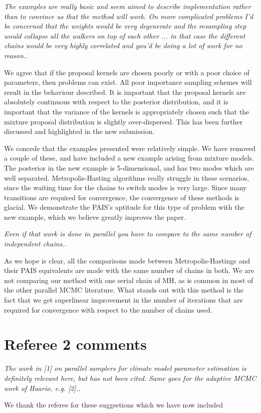 \documentclass{article}
\newcommand{\comment}[2]{\vspace{0.6cm}{\bf Comment:} {\it #1.}

\vspace{0.3cm}{\bf Answer:} #2}
\begin{document}
\comment{The examples are really basic and seem aimed to describe implementation rather than to convince us that the method will work. On more complicated problems I'd be concerned that the weights would be very degenerate and the resampling step would collapse all the walkers on top of each other ... in that case the different chains would be very highly correlated and you'd be doing a lot of work for no reason.}{We agree that if the proposal kernels are chosen poorly or with a poor choice of parameters, then problems can exist. All poor importance sampling schemes will result in the behaviour described. It is important that the proposal kernels are absolutely continuous with respect to the posterior distribution, and it is important that the variance of the kernels is appropriately chosen such that the mixture proposal distribution is slightly over-dispersed. This has been further discussed and highlighted in the new submission.

We concede that the examples presented were relatively simple. We have removed a couple of these, and have included a new example arising from mixture models. The posterior in the new example is 5-dimensional, and has two modes which are well separated. Metropolis-Hasting algorithms really struggle in these scenarios, since the waiting time for the chains to switch modes is very large. Since many transitions are required for convergence, the convergence of these methods is glacial. We demonstrate the PAIS's aptitude for this type of problem with the new example, which we believe greatly improves the paper.}

\comment{Even if that work is done in parallel you have to compare to the same number of independent chains.}{As we hope is clear, all the comparisons made between Metropolis-Hastings and their PAIS equivalents are made with the same number of chains in both. We are not comparing our method with one serial chain of MH, as is common in most of the other parallel MCMC literature. What stands out with this method is the fact that we get superlinear improvement in the number of iterations that are required for convergence with respect to the number of chains used.}

\section*{Referee 2 comments}

\comment{The work in [1] on parallel samplers for climate model parameter estimation is definitely relevant here, but has not been cited. Same goes for the adaptive MCMC work of Haario, e.g. [2].}{We thank the referee for these suggestions which we have now included}
\end{document}

